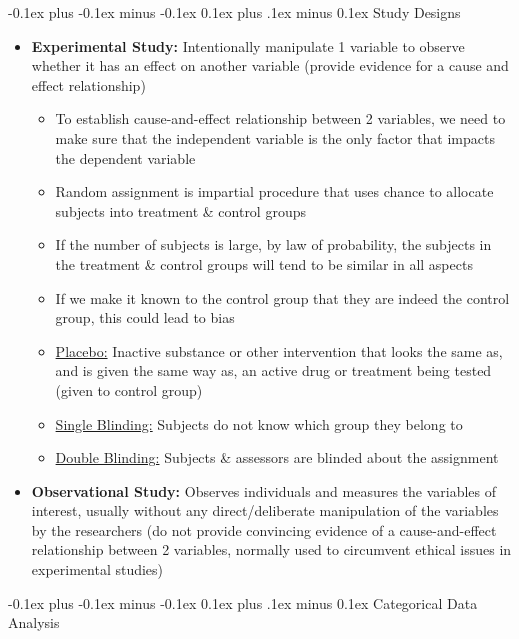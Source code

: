 \documentclass[landscape]{article}
\makeatletter
\renewcommand{\section}{\@startsection{section}{1}{0mm}%
  {-0.1ex plus -0.1ex minus -0.1ex}%
  {0.1ex plus .1ex minus 0.1ex}%
{\normalfont\small\bfseries}}
\renewcommand{\subsection}{\@startsection{subsection}{2}{0mm}%
  {-0.1ex plus -0.1ex minus -0.1ex}%
  {0.1ex plus .1ex minus 0.1ex}%
{\normalfont\scriptsize\bfseries}}
\makeatother
\begin{document}
\begin{multicols*}{5}
    \subsection{Study Designs}
    \begin{itemize}
      \item \textbf{Experimental Study:} Intentionally manipulate 1 variable to observe whether it has an effect on another variable (provide evidence for a cause and effect relationship)
      \begin{itemize}
        \item To establish cause-and-effect relationship between 2 variables, we need to make sure that the independent variable is the only factor that impacts the dependent variable
        \item Random assignment is impartial procedure that uses chance to allocate subjects into treatment \& control groups
        \item If the number of subjects is large, by law of probability, the subjects in the treatment \& control groups will tend to be similar in all aspects
        \item If we make it known to the control group that they are indeed the control group, this could lead to bias
        \item \underline{Placebo:} Inactive substance or other intervention that looks the same as, and is given the same way as, an active drug or treatment being tested (given to control group)
        \item \underline{Single Blinding:} Subjects do not know which group they belong to
        \item \underline{Double Blinding:} Subjects \& assessors are blinded about the assignment
      \end{itemize}
      \item \textbf{Observational Study:} Observes individuals and measures the variables of interest, usually without any direct/deliberate manipulation of the variables by the researchers (do not provide convincing evidence of a cause-and-effect relationship between 2 variables, normally used to circumvent ethical issues in experimental studies)
    \end{itemize}
    
    \section{Categorical Data Analysis}


\end{multicols*}
\end{document}
